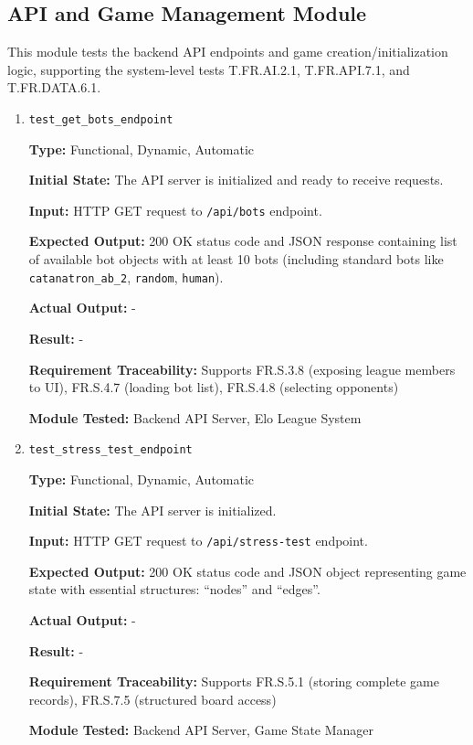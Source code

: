 \documentclass[12pt, titlepage]{article}
\begin{document}
\subsection{API and Game Management Module}

This module tests the backend API endpoints and game creation/initialization logic, supporting the system-level tests T.FR.AI.2.1, T.FR.API.7.1, and T.FR.DATA.6.1.

\begin{enumerate}

\item \texttt{test\_get\_bots\_endpoint}

\textbf{Type:} Functional, Dynamic, Automatic

\textbf{Initial State:} The API server is initialized and ready to receive requests.

\textbf{Input:} HTTP GET request to \texttt{/api/bots} endpoint.

\textbf{Expected Output:} 200 OK status code and JSON response containing list of available bot objects with at least 10 bots (including standard bots like \texttt{catanatron\_ab\_2}, \texttt{random}, \texttt{human}).

\textbf{Actual Output:} -

\textbf{Result:} -

\textbf{Requirement Traceability:} Supports FR.S.3.8 (exposing league members to UI), FR.S.4.7 (loading bot list), FR.S.4.8 (selecting opponents)

\textbf{Module Tested:} Backend API Server, Elo League System


\item \texttt{test\_stress\_test\_endpoint}

\textbf{Type:} Functional, Dynamic, Automatic

\textbf{Initial State:} The API server is initialized.

\textbf{Input:} HTTP GET request to \texttt{/api/stress-test} endpoint.

\textbf{Expected Output:} 200 OK status code and JSON object representing game state with essential structures: ``nodes'' and ``edges''.

\textbf{Actual Output:} -

\textbf{Result:} -

\textbf{Requirement Traceability:} Supports FR.S.5.1 (storing complete game records), FR.S.7.5 (structured board access)

\textbf{Module Tested:} Backend API Server, Game State Manager



\end{enumerate}
\end{document}
